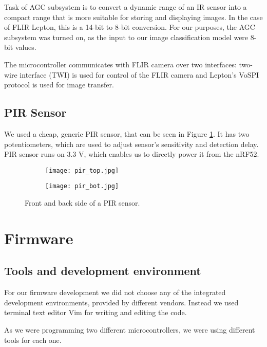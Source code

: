 Task of AGC subsystem is to convert a dynamic range of an IR sensor into a compact range that is more suitable for storing and displaying images.
In the case of FLIR Lepton, this is a 14-bit to 8-bit conversion.
For our purposes, the AGC subsystem was turned on, as the input to our image classification model were 8-bit values.

The microcontroller communicates with FLIR camera over two interfaces: two-wire interface (TWI) is used for control of the FLIR camera and Lepton's VoSPI protocol is used for image transfer.

\subsection{ PIR Sensor}

We used a cheap, generic PIR sensor, that can be seen in Figure \ref{pir_sensor}.
It has two potentiometers, which are used to adjust sensor's sensitivity and detection delay.
PIR sensor runs on 3.3 V, which enables us to directly power it from the nRF52. 
\newline
\begin{figure}[ht] 
    \begin{subfigure}[b]{0.5\textwidth}
        \centering
        \texttt{[image: pir\_top.jpg]} 
    \end{subfigure}
    \begin{subfigure}[b]{0.5\textwidth}
        \centering
        \texttt{[image: pir\_bot.jpg]} 
    \end{subfigure}
    \caption{ Front and back side of a PIR sensor.}
    \label{pir_sensor}
\end{figure}

\section{ Firmware}
\subsection{ Tools and development environment}

For our firmware development we did not choose any of the integrated development environments, provided by different vendors.
Instead we used terminal text editor Vim for writing and editing the code.

As we were programming two different microcontrollers, we were using different tools for each one.


